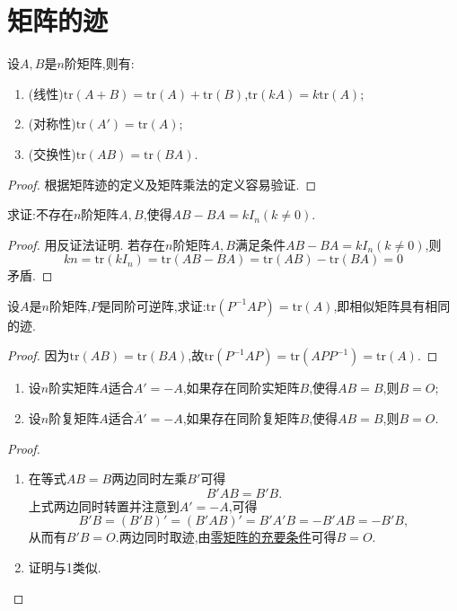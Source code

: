 \documentclass[../../main.tex]{subfiles}%
\begin{document}
\section{矩阵的迹}

\begin{proposition}[矩阵迹的性质]\label{proposition:矩阵矩阵迹的性质}
设\(A,B\)是\(n\)阶矩阵,则有:
\begin{enumerate}
\item (线性)\(\mathrm{tr}(A + B)=\mathrm{tr}(A)+\mathrm{tr}(B)\),\(\mathrm{tr}(kA)=k\mathrm{tr}(A)\);
\item (对称性)\(\mathrm{tr}(A')=\mathrm{tr}(A)\);
\item (交换性)\(\mathrm{tr}(AB)=\mathrm{tr}(BA)\).
\end{enumerate}
\end{proposition}
\begin{proof}
根据矩阵迹的定义及矩阵乘法的定义容易验证.
\end{proof}

\begin{example}
求证:不存在\(n\)阶矩阵\(A,B\),使得\(AB - BA = kI_n(k\neq0)\).
\end{example}
\begin{proof}
用反证法证明. 若存在\(n\)阶矩阵\(A,B\)满足条件\(AB - BA = kI_n(k\neq0)\),则
\[
kn=\mathrm{tr}(kI_n)=\mathrm{tr}(AB - BA)=\mathrm{tr}(AB)-\mathrm{tr}(BA)=0
\]
矛盾.
\end{proof}

\begin{proposition}
设\(A\)是\(n\)阶矩阵,\(P\)是同阶可逆阵,求证:\(\mathrm{tr}(P^{-1}AP)=\mathrm{tr}(A)\),即相似矩阵具有相同的迹.
\end{proposition}
\begin{proof}
因为\(\mathrm{tr}(AB)=\mathrm{tr}(BA)\),故\(\mathrm{tr}(P^{-1}AP)=\mathrm{tr}(APP^{-1})=\mathrm{tr}(A)\).
\end{proof}

\begin{proposition}\label{proposition:反称/反酉矩阵为零矩阵的充要条件}
\begin{enumerate}
\item 设\(n\)阶实矩阵\(A\)适合\(A'=-A\),如果存在同阶实矩阵\(B\),使得\(AB = B\),则\(B = O\);
\item 设\(n\)阶复矩阵\(A\)适合\(\overline{A}'=-A\),如果存在同阶复矩阵\(B\),使得\(AB = B\),则\(B = O\).
\end{enumerate}
\end{proposition}
\begin{proof}
\begin{enumerate}
\item 在等式\(AB = B\)两边同时左乘\(B'\)可得
\[
B'AB = B'B.
\]
上式两边同时转置并注意到\(A'=-A\),可得
\[
B'B=(B'B)'=(B'AB)'=B'A'B=-B'AB=-B'B,
\]
从而有\(B'B = O\).两边同时取迹,由\hyperref[proposition:零矩阵的充要条件]{零矩阵的充要条件}可得\(B = O\).
\item 证明与1类似.
\end{enumerate}
\end{proof}
\end{document}
